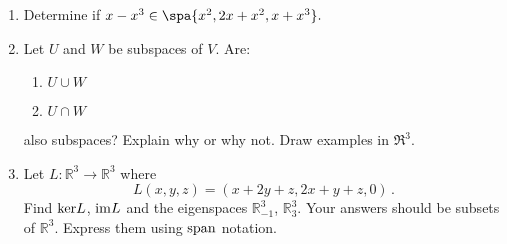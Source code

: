 


\begin{enumerate}


\item \label{subspaces_spanning_sets_polynolmial_span} {Determine} if  
$x-x^3 \in \spa\{ x^2, 2x+x^2, x+x^3 \}.$


\item\label{UandV} \hypertarget{intersections}{Let} $U$ and $W$ be subspaces of $V$.  Are:
\label{UcapV}
\begin{enumerate}
\item $U\cup W$
\item $U\cap W$
\end{enumerate}
also subspaces?  Explain why or why not.  Draw examples in $\Re^3$.



\item Let $L:{\mathbb R}^3\to {\mathbb R}^3$ where \[L(x,y,z)=(x+2y+z,2x+y+z,0)\, .\] 
Find ${\rm ker} L$, ${\rm im} L$ and the eigenspaces ${\mathbb R}^3_{-1}$, ${\mathbb R}^3_{3}$. Your answers should be subsets of ${\mathbb R}^3$. Express them using  ${\rm span}$ notation.

\end{enumerate}

